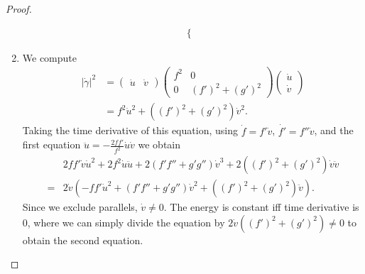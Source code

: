 \documentclass[12pt]{article}
\begin{document}
\begin{proof}
\begin{enumerate}[label=(\alph*)]
\begin{align*}
\begin{cases}
	\end{cases}
\end{align*}
\item We compute
\begin{align*}
	| \dot{ \gamma}|^2 &= \begin{pmatrix} \dot{u} & \dot{v} \end{pmatrix} \begin{pmatrix} f^2 & 0\\ 0& (f')^2+(g')^2 \end{pmatrix} \begin{pmatrix} \dot{u}\\\dot{v} \end{pmatrix}   \\
	&= f^2 \dot{u}^2 + ((f')^2+(g')^2) \dot{v}^2 .
\end{align*}
Taking the time derivative of this equation, using $ \dot{f} = f'\dot{v}$, $ \dot{f'} = f'' \dot{v}$, and the first equation $ \ddot{u} = - \frac{2ff'}{ f^2} \dot{u}\dot{v}$ we obtain
\begin{align*}
	&2ff' \dot{v} \dot{u}^2 + 2f^2 \dot{u} \ddot{u} + 2(f'f'' + g'g'') \dot{v}^3 + 2 ((f')^2+(g')^2) \dot{v} \ddot{v} \\
	=& 2\dot{v}(-ff'\dot{u}^2 + (f'f''+g'g'')\dot{v}^2 + ((f')^2+(g')^2)\ddot{v}).
\end{align*}
Since we exclude parallels, $ \dot{v} \neq 0$. The energy is constant iff time derivative is 0, where we can simply divide the equation by $2 \dot{v} ( (f')^2+(g')^2) \neq 0$ to obtain the second equation. 


\end{enumerate}
\end{proof}
\end{document}
